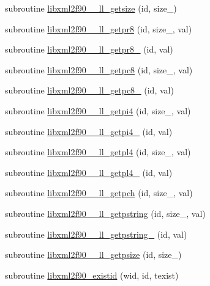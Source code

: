 \begin{DoxyCompactItemize}
\item 
subroutine \hyperlink{libxml2f90_8f90__pp_8f90_a6ae6ccc230fcca3282294c098febee5a}{libxml2f90\+\_\+\+\_\+ll\+\_\+getsize} (id, size\+\_\+)
\item 
subroutine \hyperlink{libxml2f90_8f90__pp_8f90_a5ffa8a56b1901a92be64556fe9f30e07}{libxml2f90\+\_\+\+\_\+ll\+\_\+getpr8} (id, size\+\_\+, val)
\item 
subroutine \hyperlink{libxml2f90_8f90__pp_8f90_a2a94c2cace24434f63c63fb2b59ed196}{libxml2f90\+\_\+\+\_\+ll\+\_\+getpr8\+\_\+} (id, val)
\item 
subroutine \hyperlink{libxml2f90_8f90__pp_8f90_ac08cc5083f67fe974663dee0dd7066d5}{libxml2f90\+\_\+\+\_\+ll\+\_\+getpc8} (id, size\+\_\+, val)
\item 
subroutine \hyperlink{libxml2f90_8f90__pp_8f90_adf6af0ff041c73c9d338df8a99c88137}{libxml2f90\+\_\+\+\_\+ll\+\_\+getpc8\+\_\+} (id, val)
\item 
subroutine \hyperlink{libxml2f90_8f90__pp_8f90_a02ca594441825f41fac314030efac043}{libxml2f90\+\_\+\+\_\+ll\+\_\+getpi4} (id, size\+\_\+, val)
\item 
subroutine \hyperlink{libxml2f90_8f90__pp_8f90_a3c828932bda4b9d96cb11bac75a064f2}{libxml2f90\+\_\+\+\_\+ll\+\_\+getpi4\+\_\+} (id, val)
\item 
subroutine \hyperlink{libxml2f90_8f90__pp_8f90_aae0db9dc81cd11d2c8f85d42f01321e5}{libxml2f90\+\_\+\+\_\+ll\+\_\+getpl4} (id, size\+\_\+, val)
\item 
subroutine \hyperlink{libxml2f90_8f90__pp_8f90_ac77032833d26c0b15ec204a9b8bd5888}{libxml2f90\+\_\+\+\_\+ll\+\_\+getpl4\+\_\+} (id, val)
\item 
subroutine \hyperlink{libxml2f90_8f90__pp_8f90_aa79b29b7afab3cf465e4d7b328007346}{libxml2f90\+\_\+\+\_\+ll\+\_\+getpch} (id, size\+\_\+, val)
\item 
subroutine \hyperlink{libxml2f90_8f90__pp_8f90_a956943680a07e3d0179b205f6209d9cb}{libxml2f90\+\_\+\+\_\+ll\+\_\+getpstring} (id, size\+\_\+, val)
\item 
subroutine \hyperlink{libxml2f90_8f90__pp_8f90_ae6434bdc3ab4de456efd90e496483891}{libxml2f90\+\_\+\+\_\+ll\+\_\+getpstring\+\_\+} (id, val)
\item 
subroutine \hyperlink{libxml2f90_8f90__pp_8f90_ab594e6f189158ab0e2fc4db0d03392ad}{libxml2f90\+\_\+\+\_\+ll\+\_\+getpsize} (id, size\+\_\+)
\item 
subroutine \hyperlink{libxml2f90_8f90__pp_8f90_aedaeb0ba8d5ce41c39baed261d3f82c5}{libxml2f90\+\_\+existid} (wid, id, texist)

\end{DoxyCompactItemize}
